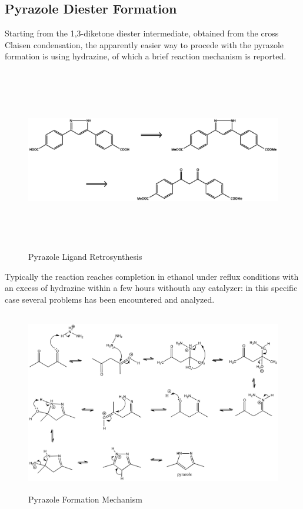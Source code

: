 \documentclass[../Master.tex]{subfiles}
\begin{document}
\subsection{Pyrazole Diester Formation}\label{sec:pyrazole-reaction}
Starting from the 1,3-diketone diester intermediate, obtained from the cross Claisen condensation, the apparently easier way to procede with the pyrazole formation is using hydrazine, of which a brief reaction mechanism is reported.

\begin{figure}[h!]
	\centering
	\includegraphics[width=16cm,height=8cm,keepaspectratio]{Structures/pyrazole-retro.eps}
	\caption{Pyrazole Ligand Retrosynthesis}\label{fig:pyrazole-retro}
\end{figure}
Typically the reaction reaches completion in ethanol under reflux conditions with an excess of hydrazine within a few hours withouth any catalyzer: in this specific case several problems has been encountered and analyzed.\\

\begin{figure}[h!]
	\centering
	\includegraphics[width=16cm,height=8cm,keepaspectratio]{Images/pyrazole-mechanism.png}
	\caption{Pyrazole Formation Mechanism}
\end{figure}
\end{document}

